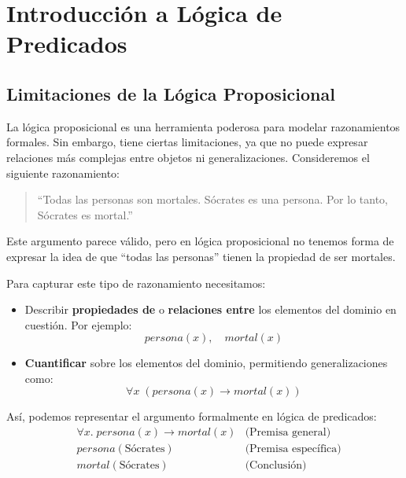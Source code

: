 \section{Introducción a Lógica de Predicados}
\subsection{Limitaciones de la Lógica Proposicional}
La lógica proposicional es una herramienta poderosa para modelar razonamientos formales. Sin embargo, tiene ciertas limitaciones, ya que no puede expresar relaciones más complejas entre objetos ni generalizaciones. Consideremos el siguiente razonamiento:

\begin{quote}
    ``Todas las personas son mortales. Sócrates es una persona. Por lo tanto, Sócrates es mortal.''
\end{quote}

Este argumento parece válido, pero en lógica proposicional no tenemos forma de expresar la idea de que ``todas las personas'' tienen la propiedad de ser mortales.

Para capturar este tipo de razonamiento necesitamos:

\begin{itemize}
    \item Describir \textbf{propiedades de} o \textbf{relaciones entre} los elementos del dominio en cuestión. Por ejemplo:
    \begin{equation}
        \mathit{persona}(x), \quad \mathit{mortal}(x)
    \end{equation}
    \item \textbf{Cuantificar} sobre los elementos del dominio, permitiendo generalizaciones como:
    \begin{equation}
        \forall x \; (\mathit{persona}(x) \rightarrow \mathit{mortal}(x))
    \end{equation}
\end{itemize}

Así, podemos representar el argumento formalmente en lógica de predicados:
\begin{align*}
    &\forall x. \; \mathit{persona}(x) \rightarrow \mathit{mortal}(x)  &\text{(Premisa general)} \\
    &\mathit{persona}(\text{Sócrates})  &\text{(Premisa específica)} \\
    &\mathit{mortal}(\text{Sócrates})  &\text{(Conclusión)}
\end{align*}

